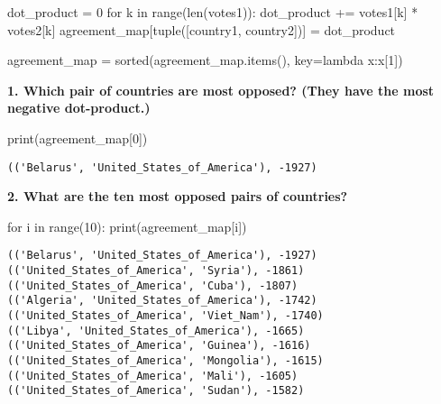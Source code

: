 \documentclass[
  letterpaper,
  DIV=11,
  numbers=noendperiod]{scrartcl}
\newenvironment{Shaded}{\begin{snugshade}}{\end{snugshade}}
\newcommand{\BuiltInTok}[1]{\textcolor[rgb]{0.00,0.23,0.31}{#1}}
\newcommand{\ControlFlowTok}[1]{\textcolor[rgb]{0.00,0.23,0.31}{#1}}
\newcommand{\DecValTok}[1]{\textcolor[rgb]{0.68,0.00,0.00}{#1}}
\newcommand{\KeywordTok}[1]{\textcolor[rgb]{0.00,0.23,0.31}{#1}}
\newcommand{\NormalTok}[1]{\textcolor[rgb]{0.00,0.23,0.31}{#1}}
\newcommand{\OperatorTok}[1]{\textcolor[rgb]{0.37,0.37,0.37}{#1}}
\begin{document}
\begin{Shaded}
\begin{Highlighting}[numbers=left,,]
\NormalTok{        dot\_product }\OperatorTok{=} \DecValTok{0}
        \ControlFlowTok{for}\NormalTok{ k }\KeywordTok{in} \BuiltInTok{range}\NormalTok{(}\BuiltInTok{len}\NormalTok{(votes1)):}
\NormalTok{            dot\_product }\OperatorTok{+=}\NormalTok{ votes1[k] }\OperatorTok{*}\NormalTok{ votes2[k]}
\NormalTok{        agreement\_map[}\BuiltInTok{tuple}\NormalTok{([country1, country2])] }\OperatorTok{=}\NormalTok{ dot\_product}

\NormalTok{agreement\_map }\OperatorTok{=} \BuiltInTok{sorted}\NormalTok{(agreement\_map.items(), key}\OperatorTok{=}\KeywordTok{lambda}\NormalTok{ x:x[}\DecValTok{1}\NormalTok{])}
\end{Highlighting}
\end{Shaded}

\textbf{1. Which pair of countries are most opposed? (They have the most
negative dot-product.)}

\begin{Shaded}
\begin{Highlighting}[numbers=left,,]
\BuiltInTok{print}\NormalTok{(agreement\_map[}\DecValTok{0}\NormalTok{])}
\end{Highlighting}
\end{Shaded}

\begin{verbatim}
(('Belarus', 'United_States_of_America'), -1927)
\end{verbatim}

\textbf{2. What are the ten most opposed pairs of countries?}

\begin{Shaded}
\begin{Highlighting}[numbers=left,,]
\ControlFlowTok{for}\NormalTok{ i }\KeywordTok{in} \BuiltInTok{range}\NormalTok{(}\DecValTok{10}\NormalTok{):}
  \BuiltInTok{print}\NormalTok{(agreement\_map[i])}
\end{Highlighting}
\end{Shaded}

\begin{verbatim}
(('Belarus', 'United_States_of_America'), -1927)
(('United_States_of_America', 'Syria'), -1861)
(('United_States_of_America', 'Cuba'), -1807)
(('Algeria', 'United_States_of_America'), -1742)
(('United_States_of_America', 'Viet_Nam'), -1740)
(('Libya', 'United_States_of_America'), -1665)
(('United_States_of_America', 'Guinea'), -1616)
(('United_States_of_America', 'Mongolia'), -1615)
(('United_States_of_America', 'Mali'), -1605)
(('United_States_of_America', 'Sudan'), -1582)
\end{verbatim}
\end{document}
